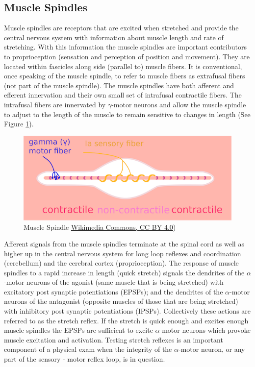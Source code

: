 \subsection{Muscle Spindles}

Muscle spindles are receptors that are excited when stretched and provide the central nervous system with information about muscle length and rate of stretching. With this information the muscle spindles are important contributors to proprioception (sensation and perception of position and movement). They are located within fascicles along side (parallel to) muscle fibers. It is conventional, once speaking of the muscle spindle, to refer to muscle fibers as extrafusal fibers (not part of the muscle spindle). The muscle spindles have both afferent and efferent innervation and their own small set of intrafusal contractile fibers. The intrafusal fibers are innervated by $\gamma$-motor neurons and allow the muscle spindle to adjust to the length of the muscle to remain sensitive to changes in length (See Figure \ref{fig:MuscleSpindle}). 

\begin{figure}[!ht]
    \centering
    \includegraphics[width=1\linewidth]{./figure/MuscleSpindle.png}
    \caption{Muscle Spindle \footnotesize{\href{https://commons.wikimedia.org/wiki/File:MuscleSpindle.svg}{Wikimedia Commons, CC BY 4.0})}}
    \label{fig:MuscleSpindle}
\end{figure}

Afferent signals from the muscle spindles terminate at the spinal cord as well as higher up in the central nervous system for long loop reflexes and coordination (cerebellum) and the cerebral cortex (proprioception). The response of muscle spindles to a rapid increase in length (quick stretch) signals the dendrites of the $\alpha$-motor neurons of the agonist (same muscle that is being stretched) with excitatory post synaptic potentiations (EPSPs); and the dendrites of the $\alpha$-motor neurons of the antagonist (opposite muscles of those that are being stretched) with inhibitory post synaptic potentiations (IPSPs). Collectively these actions are referred to as the stretch reflex. If the stretch is quick enough and excites enough muscle spindles the EPSPs are sufficient to excite $\alpha$-motor neurons which provoke muscle excitation and activation. Testing stretch reflexes is an important component of a physical exam when the integrity of the $\alpha$-motor neuron, or any part of the sensory - motor reflex loop, is in question.

